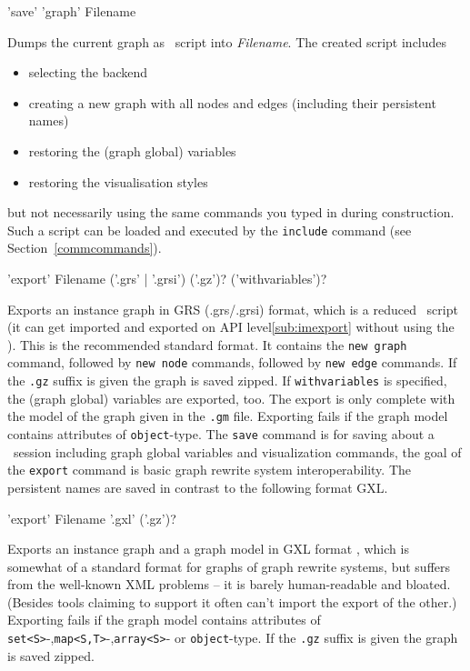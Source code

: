 \begin{rail}
  'save' 'graph' Filename
\end{rail}
Dumps the current graph as \GrShell\ script into \emph{Filename}.
The created script includes
\begin{itemize}
  \item selecting the backend
  \item creating a new graph with all nodes and edges (including their persistent names)
  \item restoring the (graph global) variables
  \item restoring the visualisation styles
\end{itemize}
but not necessarily using the same commands you typed in during construction. 
Such a script can be loaded and executed by the \texttt{include} command (see Section~\ref{commcommands}).

\begin{rail}
  'export' Filename ('.grs' | '.grsi') ('.gz')? ('withvariables')?
\end{rail}
Exports an instance graph in GRS (.grs/.grsi) format, which is a reduced \GrShell\ script
(it can get imported and exported on API level\ref{sub:imexport} without using the \GrShell).
This is the recommended standard format.
It contains the \texttt{new graph} command, followed by \texttt{new node} commands, followed by \texttt{new edge} commands.
If the \texttt{.gz} suffix is given the graph is saved zipped.
If \texttt{withvariables} is specified, the (graph global) variables are exported, too.
The export is only complete with the model of the graph given in the \texttt{.gm} file.
Exporting fails if the graph model contains attributes of \texttt{object}-type.
The \texttt{save} command is for saving about a \GrShell\ session including graph global variables and visualization commands, 
the goal of the \texttt{export} command is basic graph rewrite system interoperability.
The persistent names are saved in contrast to the following format GXL.

\begin{rail}
  'export' Filename '.gxl' ('.gz')?
\end{rail}
Exports an instance graph and a graph model in GXL format \cite{GXL,GXL2}, 
which is somewhat of a standard format for graphs of graph rewrite systems, 
but suffers from the well-known XML problems -- it is barely human-readable and bloated.
(Besides tools claiming to support it often can't import the export of the other.)
Exporting fails if the graph model contains attributes of \texttt{set<S>}-,\texttt{map<S,T>}-,\texttt{array<S>}- or \texttt{object}-type.
If the \texttt{.gz} suffix is given the graph is saved zipped.

